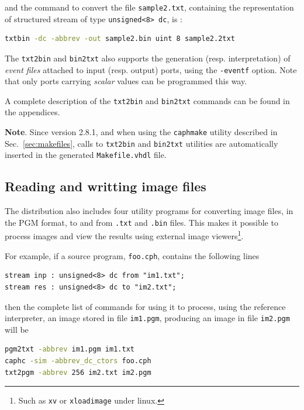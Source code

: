 and the command to convert the file \verb|sample2.txt|, containing the representation of
structured stream of type \verb|unsigned<8> dc|, is :

\begin{lstlisting}[language=bash]
txtbin -dc -abbrev -out sample2.bin uint 8 sample2.2txt
\end{lstlisting}

\medskip
The \verb|txt2bin| and \verb|bin2txt| also supports the generation (resp. interpretation) of
\emph{event files} attached to input (resp. output) ports, using the \verb|-eventf| option. Note
that only ports carrying \emph{scalar} values can be programmed this way.

\medskip A complete description of the \verb|txt2bin| and \verb|bin2txt| commands can be found in
the appendices. 

\medskip \textbf{Note}. Since version 2.8.1, and when using the \verb|caphmake| utility described in
Sec.~\ref{sec:makefiles}, calls to \verb|txt2bin| and \verb|bin2txt| utilities are automatically
inserted in the generated \verb|Makefile.vhdl| file.

\subsection{Reading and writting image files}
\label{sec:pgm-io}

The \caph distribution also includes four utility programs for converting image files, in the PGM
format, to and from \verb|.txt| and \verb|.bin|  files. This makes it possible to process images and view the results using
external image viewers\footnote{Such as \texttt{xv} or \texttt{xloadimage} under linux.}. 

For example, if a \caph source program, \verb|foo.cph|, contains the following lines

\begin{lstlisting}
stream inp : unsigned<8> dc from "im1.txt";
stream res : unsigned<8> dc to "im2.txt";
\end{lstlisting}

then the complete list of commands for using it to process, using the reference interpreter, an
image stored in file \verb|im1.pgm|, producing an image in file \verb|im2.pgm| will be

\begin{lstlisting}[language=bash]
pgm2txt -abbrev im1.pgm im1.txt
caphc -sim -abbrev_dc_ctors foo.cph
txt2pgm -abbrev 256 im2.txt im2.pgm
\end{lstlisting}

